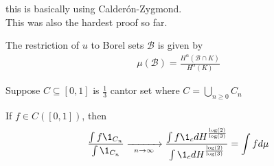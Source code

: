 \begin{remark}
	this is basically using Calder\'{o}n-Zygmond. \\
	This was also the hardest proof so far.
\end{remark}

\begin{example}
	The restriction of $u$ to Borel sets $\mathcal{B}$ is given by
	\begin{align*}
		\mu ( \mathcal{B} ) = \frac{H^{\alpha} (\mathcal{B} \cap K)}{H^{\alpha} (K)}
	\end{align*} 
\end{example}

\begin{exercise}
	Suppose $C \subseteq  [0,1]$ is $\frac{1}{3}$ cantor set where $C = \bigcup_{n \geq 0} C_{n}$

	If $f \in C([0,1])$, then
	\begin{align*}
		\frac{\int f \1_{C_n}}{\int \1_{C_n}}  \xrightarrow[\enskip n \to \infty\enskip]{} 
		\frac{\int f \1_{c} d H^{\frac{\log(2)}{\log(3)}}}{\int \1_{c} d H^{\frac{\log(2)}{\log(3)}}}
	= \int f d\mu
	\end{align*} 
\end{exercise}



